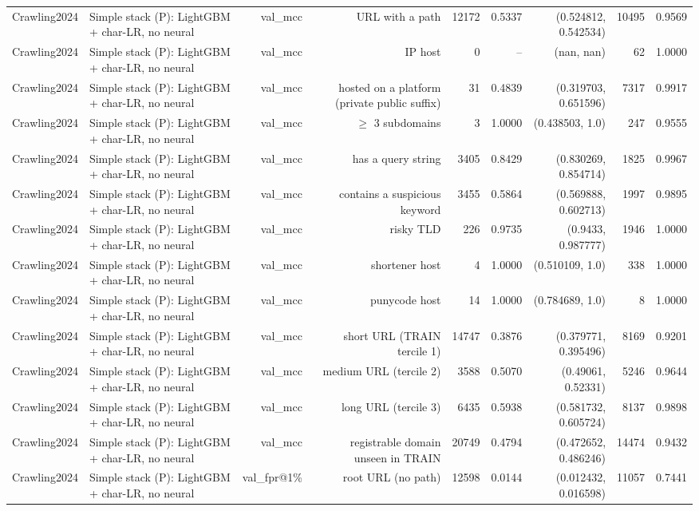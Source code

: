 \begin{table}[t]
\begin{tabular}{llrrrrrrr}
Crawling2024 & Simple stack (P): LightGBM + char-LR, no neural & val\_mcc & URL with a path & 12172 & 0.5337 & (0.524812, 0.542534) & 10495 & 0.9569 \\
Crawling2024 & Simple stack (P): LightGBM + char-LR, no neural & val\_mcc & IP host & 0 & -- & (nan, nan) & 62 & 1.0000 \\
Crawling2024 & Simple stack (P): LightGBM + char-LR, no neural & val\_mcc & hosted on a platform (private public suffix) & 31 & 0.4839 & (0.319703, 0.651596) & 7317 & 0.9917 \\
Crawling2024 & Simple stack (P): LightGBM + char-LR, no neural & val\_mcc & $\geq$ 3 subdomains & 3 & 1.0000 & (0.438503, 1.0) & 247 & 0.9555 \\
Crawling2024 & Simple stack (P): LightGBM + char-LR, no neural & val\_mcc & has a query string & 3405 & 0.8429 & (0.830269, 0.854714) & 1825 & 0.9967 \\
Crawling2024 & Simple stack (P): LightGBM + char-LR, no neural & val\_mcc & contains a suspicious keyword & 3455 & 0.5864 & (0.569888, 0.602713) & 1997 & 0.9895 \\
Crawling2024 & Simple stack (P): LightGBM + char-LR, no neural & val\_mcc & risky TLD & 226 & 0.9735 & (0.9433, 0.987777) & 1946 & 1.0000 \\
Crawling2024 & Simple stack (P): LightGBM + char-LR, no neural & val\_mcc & shortener host & 4 & 1.0000 & (0.510109, 1.0) & 338 & 1.0000 \\
Crawling2024 & Simple stack (P): LightGBM + char-LR, no neural & val\_mcc & punycode host & 14 & 1.0000 & (0.784689, 1.0) & 8 & 1.0000 \\
Crawling2024 & Simple stack (P): LightGBM + char-LR, no neural & val\_mcc & short URL (TRAIN tercile 1) & 14747 & 0.3876 & (0.379771, 0.395496) & 8169 & 0.9201 \\
Crawling2024 & Simple stack (P): LightGBM + char-LR, no neural & val\_mcc & medium URL (tercile 2) & 3588 & 0.5070 & (0.49061, 0.52331) & 5246 & 0.9644 \\
Crawling2024 & Simple stack (P): LightGBM + char-LR, no neural & val\_mcc & long URL (tercile 3) & 6435 & 0.5938 & (0.581732, 0.605724) & 8137 & 0.9898 \\
Crawling2024 & Simple stack (P): LightGBM + char-LR, no neural & val\_mcc & registrable domain unseen in TRAIN & 20749 & 0.4794 & (0.472652, 0.486246) & 14474 & 0.9432 \\
Crawling2024 & Simple stack (P): LightGBM + char-LR, no neural & val\_fpr@1\% & root URL (no path) & 12598 & 0.0144 & (0.012432, 0.016598) & 11057 & 0.7441 \\

\end{tabular}
\end{table}
